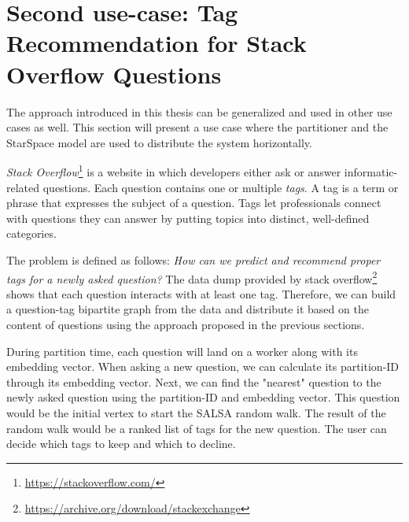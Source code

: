 \section{Second use-case: Tag Recommendation for Stack Overflow Questions}
\label{sec:second-usecase}
The approach introduced in this thesis can be generalized and used in other use cases as well. This section will present a use case where the partitioner and the StarSpace model are used to distribute the system horizontally.


\emph{Stack Overflow}\footnote{\url{https://stackoverflow.com/}} is a website in which developers either ask or answer informatic-related questions. Each question contains one or multiple \emph{tags}. A tag is a term or phrase that expresses the subject of a question. Tags let professionals connect with questions they can answer by putting topics into distinct, well-defined categories.


The problem is defined as follows: \emph{How can we predict and recommend proper tags for a newly asked question?} The data dump provided by stack overflow\footnote{\url{https://archive.org/download/stackexchange}} shows that each question interacts with at least one tag. Therefore, we can build a question-tag bipartite graph from the data and distribute it based on the content of questions using the approach proposed in the previous sections.


During partition time, each question will land on a worker along with its embedding vector. When asking a new question, we can calculate its partition-ID through its embedding vector. Next, we can find the "nearest" question to the newly asked question using the partition-ID and embedding vector. This question would be the initial vertex to start the SALSA random walk. The result of the random walk would be a ranked list of tags for the new question. The user can decide which tags to keep and which to decline.

